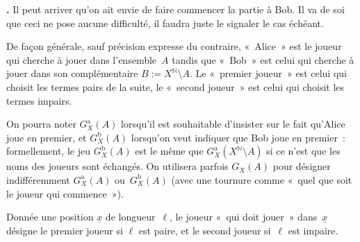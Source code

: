 \documentclass[12pt,a4paper]{article}
\theoremstyle{definition}
\newcommand\thingy{%
\refstepcounter{comcnt}\smallskip\noindent\textbf{\thecomcnt.} }
\begin{document}
\thingy\label{remark-player-names} Il peut arriver qu'on ait envie de
faire commencer la partie à Bob.  Il va de soi que ceci ne pose aucune
difficulté, il faudra juste le signaler le cas échéant.

De façon générale, sauf précision expresse du contraire, « Alice » est
le joueur qui cherche à jouer dans l'ensemble $A$ tandis que « Bob »
est celui qui cherche à jouer dans son complémentaire $B :=
X^{\mathbb{N}} \setminus A$.  Le « premier joueur » est celui qui
choisit les termes pairs de la suite, le « second joueur » est celui
qui choisit les termes impairs.

On pourra noter $G_X^{\mathrm{a}}(A)$ lorsqu'il est souhaitable
d'insister sur le fait qu'Alice joue en premier, et
$G_X^{\mathrm{b}}(A)$ lorsqu'on veut indiquer que Bob joue en
premier : formellement, le jeu $G_X^{\mathrm{b}}(A)$ est le même que
$G_X^{\mathrm{a}}(X^{\mathbb{N}}\setminus A)$ si ce n'est que les noms
des joueurs sont échangés.  On utilisera parfois $G_X(A)$ pour
désigner indifféremment $G_X^{\mathrm{a}}(A)$ ou $G_X^{\mathrm{b}}(A)$
(avec une tournure comme « quel que soit le joueur qui commence »).

Donnée une position $\underline{x}$ de longueur $\ell$, le joueur
« qui doit jouer » dans $\underline{x}$ désigne le premier joueur si
$\ell$ est paire, et le second joueur si $\ell$ est impaire.
\end{document}
